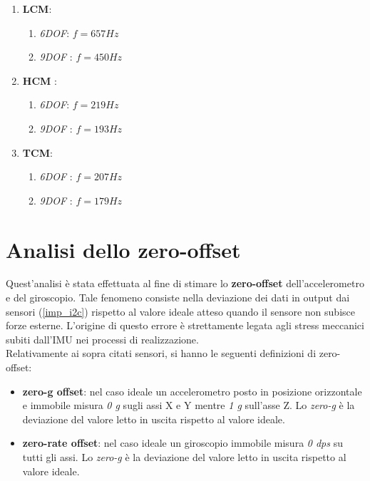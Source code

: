 \begin{enumerate}
	\item \textbf{LCM}:
	\begin{enumerate}
		\item \textit{6DOF}: $f = 657 Hz $
		\item \textit{9DOF} : $f = 450 Hz $
	\end{enumerate}
	\item \textbf{HCM} :
	\begin{enumerate}
		\item \textit{6DOF}: $f = 219 Hz $
		\item \textit{9DOF} : $f = 193 Hz $
	\end{enumerate}
	\item \textbf{TCM}:
	\begin{enumerate}
		\item \textit{6DOF} : $f = 207 Hz $
		\item \textit{9DOF} : $f = 179 Hz $
	\end{enumerate}
\end{enumerate}

\section{Analisi dello zero-offset}
Quest'analisi è stata effettuata al fine di stimare lo \textbf{zero-offset} dell'accelerometro e del giroscopio. Tale fenomeno consiste nella deviazione dei dati in output dai sensori (\ref{imp_i2c}) rispetto al valore ideale atteso quando il sensore non subisce forze esterne. L'origine di questo errore è strettamente legata agli stress meccanici subiti dall'IMU nei processi di realizzazione.\\
Relativamente ai sopra citati sensori, si hanno le seguenti definizioni di zero-offset:
\begin{itemize}
	\item \textbf{zero-g offset}: nel caso ideale un accelerometro posto in posizione orizzontale e immobile misura \textit{0 g} sugli assi X e Y mentre \textit{1 g} sull'asse Z. Lo \textit{zero-g} è la deviazione del valore letto in uscita rispetto al valore ideale.
	\item \textbf{zero-rate offset}: nel caso ideale un giroscopio immobile misura \textit{0 dps} su tutti gli assi. Lo \textit{zero-g} è la deviazione del valore letto in uscita rispetto al valore ideale.
\end{itemize}

